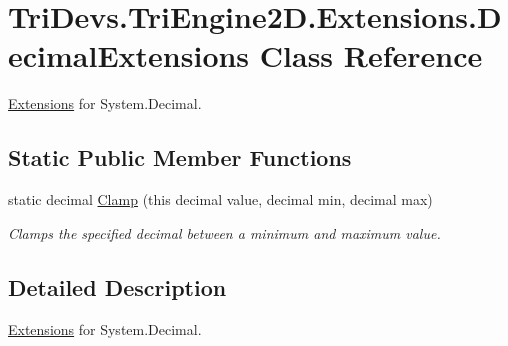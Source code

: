 \hypertarget{class_tri_devs_1_1_tri_engine2_d_1_1_extensions_1_1_decimal_extensions}{\section{Tri\-Devs.\-Tri\-Engine2\-D.\-Extensions.\-Decimal\-Extensions Class Reference}
\label{class_tri_devs_1_1_tri_engine2_d_1_1_extensions_1_1_decimal_extensions}
}


\hyperlink{namespace_tri_devs_1_1_tri_engine2_d_1_1_extensions}{Extensions} for System.\-Decimal.  


\subsection*{Static Public Member Functions}
\begin{DoxyCompactItemize}
\item 
static decimal \hyperlink{class_tri_devs_1_1_tri_engine2_d_1_1_extensions_1_1_decimal_extensions_ac7f5febb4126439c95df66f88ba01a8b}{Clamp} (this decimal value, decimal min, decimal max)
\begin{DoxyCompactList}\small\item\em Clamps the specified decimal between a minimum and maximum value. \end{DoxyCompactList}\end{DoxyCompactItemize}


\subsection{Detailed Description}
\hyperlink{namespace_tri_devs_1_1_tri_engine2_d_1_1_extensions}{Extensions} for System.\-Decimal. 



